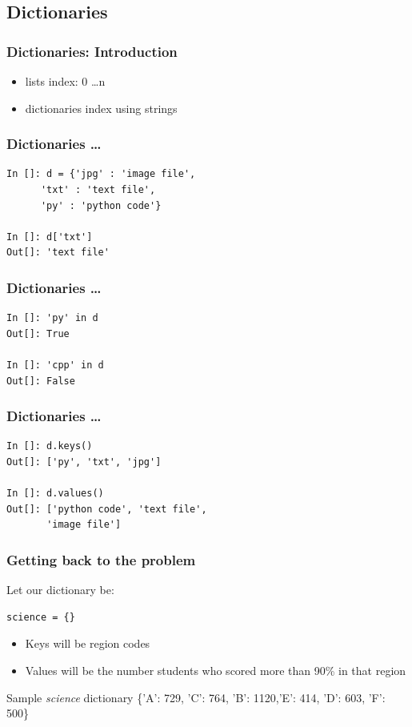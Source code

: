 \documentclass[14pt,compress]{beamer}
\newcounter{time}
\newcommand{\inctime}[1]{\addtocounter{time}{#1}{\tiny \thetime\ m}}
\begin{document}
\subsection{Dictionaries}
\begin{frame}[fragile]
  \frametitle{Dictionaries: Introduction}
  \begin{itemize}
    \item lists index: 0 \ldots n
    \item dictionaries index using strings
  \end{itemize}
\end{frame}

\begin{frame}[fragile]
  \frametitle{Dictionaries \ldots}
  \begin{lstlisting}
In []: d = {'jpg' : 'image file',
      'txt' : 'text file', 
      'py' : 'python code'}

In []: d['txt']
Out[]: 'text file'
  \end{lstlisting}
\end{frame}

\begin{frame}[fragile]
  \frametitle{Dictionaries \ldots}
  \begin{lstlisting}
In []: 'py' in d
Out[]: True

In []: 'cpp' in d
Out[]: False
  \end{lstlisting}
\end{frame}

\begin{frame}[fragile]
  \frametitle{Dictionaries \ldots}
  \begin{lstlisting}
In []: d.keys()
Out[]: ['py', 'txt', 'jpg']

In []: d.values()
Out[]: ['python code', 'text file',
       'image file']
  \end{lstlisting}
  \inctime{10}
\end{frame}

\begin{frame}[fragile]
  \frametitle{Getting back to the problem}
  Let our dictionary be:
  \begin{lstlisting}
science = {}
  \end{lstlisting}
\begin{itemize}
    \item Keys will be region codes
    \item Values will be the number students who scored more than 90\% in that region
  \end{itemize}
  \begin{block}{Sample \emph{science} dictionary}
    \{'A': 729, 'C': 764, 'B': 1120,'E': 414, 'D': 603, 'F': 500\}
  \end{block}

\end{frame}
\end{document}
